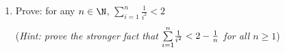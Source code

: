 \begin{exercises}{}{}
\begin{enumerate}
% 




	
		\item Prove: for any $n\in\N$, $\sum\limits_{i=1}^n\frac{1}{i^2}<2$\par
		(\emph{Hint: prove the stronger fact that $\smash{\sum\limits_{i=1}^n} \frac{1}{i^2} < 2 - \frac{1}{n}$ for all $n \ge 1$})
\end{enumerate}

\end{exercises}


